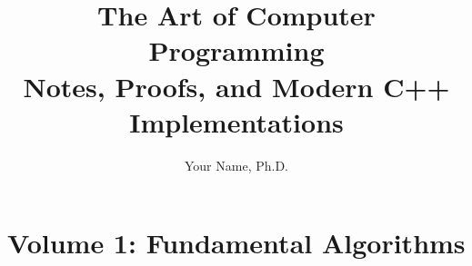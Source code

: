 \documentclass[11pt,oneside]{book}
\title{\textbf{The Art of Computer Programming}\\ \large Notes, Proofs, and Modern C++ Implementations}
\author{Your Name, Ph.D.}
\date{\gitDate}
\begin{document}
\maketitle
\tableofcontents

\chapter{Volume 1: Fundamental Algorithms}

\end{document}
